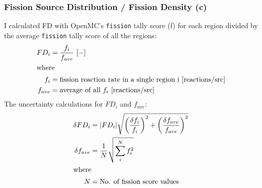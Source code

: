 \subsubsection{Fission Source Distribution / Fission Density (c)}
I calculated \gls{FD} with OpenMC's \texttt{fission} tally score (f) 
for each region divided by the average \texttt{fission} tally score of all the regions:
\begin{align}
    FD_i &=  \frac{f_i}{f_{ave}}\ [-]\\
    \intertext{where}
    f_i &= \mbox{fission reaction rate in a single region i [reactions/src]} \nonumber \\
    f_{ave} &= \mbox{average of all $f_i$ [reactions/src]} \nonumber
\end{align}
The uncertainty calculations for $FD_i$ and $f_{ave}$: 
\begin{align}
    \delta FD_i &= |FD_i| \sqrt{\left(\frac{\delta f_i}{f_i}\right)^2+\left(\frac{\delta f_{ave}}{f_{ave}}\right)^2} \\
    \delta f_{ave} &= \frac{1}{N}\sqrt{\sum_i^Nf_i^2} \\
    \intertext{where}
    N &= \mbox{No. of fission score values} \nonumber
\end{align}

